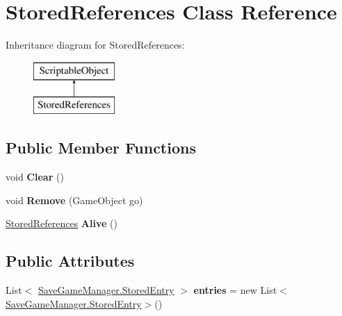 \hypertarget{class_stored_references}{}\section{Stored\+References Class Reference}
\label{class_stored_references}
Inheritance diagram for Stored\+References\+:\begin{figure}[H]
\begin{center}
\leavevmode
\includegraphics[height=2.000000cm]{class_stored_references}
\end{center}
\end{figure}
\subsection*{Public Member Functions}
\begin{DoxyCompactItemize}
\item 
\mbox{\label{class_stored_references_a3b6f3679a8082b67c815d29afa678266}} 
void {\bfseries Clear} ()
\item 
\mbox{\label{class_stored_references_a8ae5d6ccb3a28cff41d650a5d6e5cc3e}} 
void {\bfseries Remove} (Game\+Object go)
\item 
\mbox{\label{class_stored_references_a7d080ac609b32b7527a8275aefffaf1c}} 
\hyperlink{class_stored_references}{Stored\+References} {\bfseries Alive} ()
\end{DoxyCompactItemize}
\subsection*{Public Attributes}
\begin{DoxyCompactItemize}
\item 
\mbox{\label{class_stored_references_a79be997e8a3b8867dec7c1e4816ba270}} 
List$<$ \hyperlink{class_save_game_manager_1_1_stored_entry}{Save\+Game\+Manager.\+Stored\+Entry} $>$ {\bfseries entries} = new List$<$\hyperlink{class_save_game_manager_1_1_stored_entry}{Save\+Game\+Manager.\+Stored\+Entry}$>$()
\end{DoxyCompactItemize}
